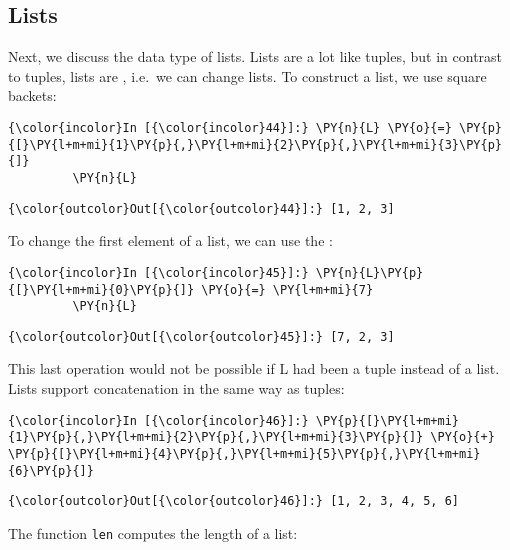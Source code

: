\subsection{Lists}\label{lists}
Next, we discuss the data type of lists. Lists are a lot like tuples,
but in contrast to tuples, lists are , i.e.~we can
change lists. To construct a list, we use square backets:

\begin{Verbatim}[commandchars=\\\{\}]
{\color{incolor}In [{\color{incolor}44}]:} \PY{n}{L} \PY{o}{=} \PY{p}{[}\PY{l+m+mi}{1}\PY{p}{,}\PY{l+m+mi}{2}\PY{p}{,}\PY{l+m+mi}{3}\PY{p}{]}
         \PY{n}{L}
\end{Verbatim}


\begin{Verbatim}[commandchars=\\\{\}]
{\color{outcolor}Out[{\color{outcolor}44}]:} [1, 2, 3]
\end{Verbatim}
To change the first element of a list, we can use the :

\begin{Verbatim}[commandchars=\\\{\}]
{\color{incolor}In [{\color{incolor}45}]:} \PY{n}{L}\PY{p}{[}\PY{l+m+mi}{0}\PY{p}{]} \PY{o}{=} \PY{l+m+mi}{7}
         \PY{n}{L}
\end{Verbatim}

\begin{Verbatim}[commandchars=\\\{\}]
{\color{outcolor}Out[{\color{outcolor}45}]:} [7, 2, 3]
\end{Verbatim}
This last operation would not be possible if L had been a tuple instead
of a list. Lists support concatenation in the same way as tuples:

\begin{Verbatim}[commandchars=\\\{\}]
{\color{incolor}In [{\color{incolor}46}]:} \PY{p}{[}\PY{l+m+mi}{1}\PY{p}{,}\PY{l+m+mi}{2}\PY{p}{,}\PY{l+m+mi}{3}\PY{p}{]} \PY{o}{+} \PY{p}{[}\PY{l+m+mi}{4}\PY{p}{,}\PY{l+m+mi}{5}\PY{p}{,}\PY{l+m+mi}{6}\PY{p}{]}
\end{Verbatim}


\begin{Verbatim}[commandchars=\\\{\}]
{\color{outcolor}Out[{\color{outcolor}46}]:} [1, 2, 3, 4, 5, 6]
\end{Verbatim}
The function \texttt{len} computes the length of a list:

